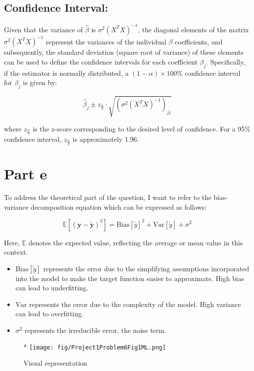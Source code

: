 \documentclass{article}
\begin{document}
\subsection*{Confidence Interval:}

Given that the variance of \( \hat{\beta} \) is \( \sigma^2 (X^T X)^{-1} \), the diagonal elements of the matrix \( \sigma^2 (X^T X)^{-1} \) represent the variances of the individual \( \beta \) coefficients, and subsequently, the standard deviation (square root of variance) of these elements can be used to define the confidence intervals for each coefficient \( \beta_j \). Specifically, if the estimator is normally distributed, a \( (1 - \alpha) \times 100 \% \) confidence interval for \( \beta_j \) is given by:

\[ \hat{\beta}_j \pm z_{\frac{\alpha}{2}} \cdot \sqrt{\left(\sigma^2 (X^T X)^{-1}\right)_{jj}} \]

where \( z_{\frac{\alpha}{2}} \) is the z-score corresponding to the desired level of confidence. For a 95\% confidence interval, \( z_{\frac{\alpha}{2}} \) is approximately 1.96.


\section*{Part e}


To address the theoretical part of the question, I want to refer to the bias-variance decomposition equation which can be expressed as follows:

\[
\mathbb{E}[(\bm{y} - \bm{\tilde{y}})^2] = \mathrm{Bias}[\tilde{y}]^2 + \mathrm{Var}[\tilde{y}] + \sigma^2
\]


Here, $\mathbb{E}$ denotes the expected value, reflecting the average or mean value in this context.

\begin{itemize}
    \item $\mathrm{Bias} [\tilde{y}]$ represents the error due to the simplifying assumptions incorporated into the model to make the target function easier to approximate. High bias can lead to underfitting.
    \item $\mathrm{Var}$ represents the error due to the complexity of the model. High variance can lead to overfitting.
    \item $\sigma^2$ represents the irreducible error, the noise term.
\end{itemize}

\begin{figure}[htbp]*
    \centering
    \texttt{[image: fig/Project1Problem6Fig1ML.png]}
    \caption{Visual representation}
    \label{fig:python-code}
\end{figure}
\end{document}
